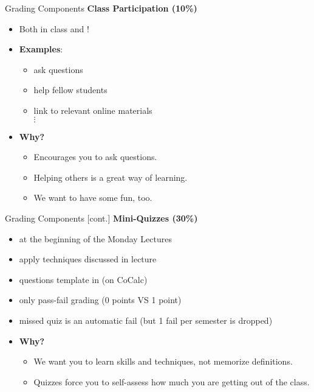 \documentclass[professionalfonts, xcolor={usenames,svgnames,x11names,table}]{beamer}
\begin{document}
\begin{frame}{Grading Components}
    \textbf{Class Participation (10\%)}
        \begin{itemize}
            \item Both in class and !
            \item \textbf{Examples}:
                \begin{itemize}
                    \item ask questions
                    \item help fellow students
                    \item link to relevant online materials\\
                        $\vdots$
                \end{itemize}
            \item \textbf{Why?} 
                \begin{itemize}
                    \item Encourages you to ask questions.
                    \item Helping others is a great way of learning.
                    \item We want to have some fun, too.
                \end{itemize}
        \end{itemize}
\end{frame}

\begin{frame}{Grading Components [cont.]}
    \textbf{Mini-Quizzes (30\%)}
        \begin{itemize}
            \item at the beginning of the Monday Lectures
            \item apply techniques discussed in lecture
            \item questions template in  (on CoCalc)
            \item only pass-fail grading (0 points VS 1 point)
            \item missed quiz is an automatic fail  (but 1 fail per semester is dropped)
            \item \textbf{Why?}
                \begin{itemize}
                    \item We want you to learn skills and techniques, not memorize definitions.
                                               \item Quizzes force you to self-assess how much you are getting out of the class.
                \end{itemize}
        \end{itemize}
\end{frame}
\end{document}
